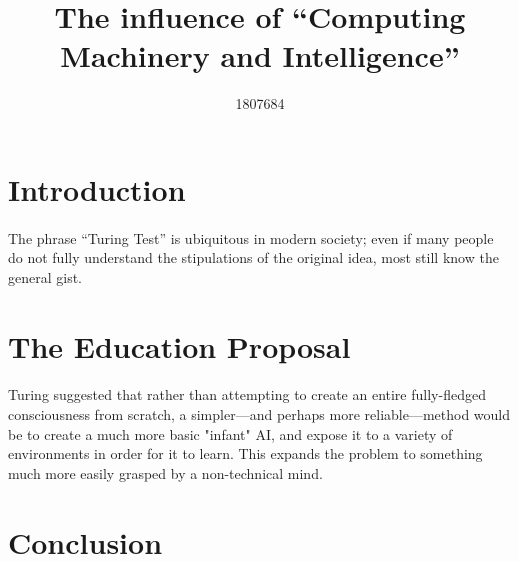 \documentclass{scrartcl}
\title{The influence of “Computing Machinery and Intelligence”}
\author{1807684}
\begin{document}
\maketitle

\section{Introduction}
\paragraph{}
The phrase “Turing Test” is ubiquitous in modern society; even if many people do not fully understand the stipulations of the original idea, most still know the general gist.

\section{The Education Proposal}
\paragraph{}  %
Turing suggested that rather than attempting to create an entire fully-fledged consciousness from scratch, a simpler—and perhaps more reliable—method would be to create a much more basic "infant" AI, and expose it to a variety of environments in order for it to learn. This expands the problem to something much more easily grasped by a non-technical mind.\cite{Infants}

\section{Conclusion}
\paragraph{}



\end{document}
